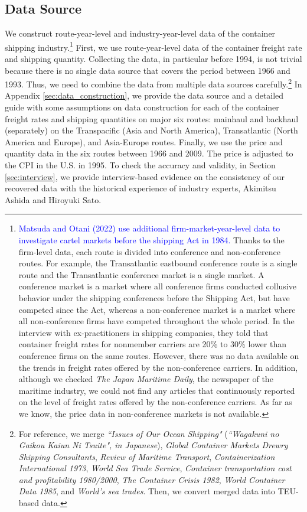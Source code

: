 \documentclass[11pt]{article}
\begin{document}
\subsection{Data Source}\label{subsec:data}
We construct route-year-level and industry-year-level data of the container shipping industry.\footnote{\textcolor{blue}{Matsuda and Otani (2022) use additional firm-market-year-level data to investigate cartel markets before the shipping Act in 1984.} Thanks to the firm-level data, each route is divided into conference and non-conference routes. For example, the Transatlantic eastbound conference route is a single route and the Transatlantic conference market is a single market. A conference market is a market where all conference firms conducted collusive behavior under the shipping conferences before the Shipping Act, but have competed since the Act, whereas a non-conference market is a market where all non-conference firms have competed throughout the whole period. In the interview with ex-practitioners in shipping companies, they told that container freight rates for nonmember carriers are 20\% to 30\% lower than conference firms on the same routes. However, there was no data available on the trends in freight rates offered by the non-conference carriers. In addition, although we checked \textit{The Japan Maritime Daily}, the newspaper of the maritime industry, we could not find any articles that continuously reported on the level of freight rates offered by the non-conference carriers. As far as we know, the price data in non-conference markets is not available.} First, we use route-year-level data of the container freight rate and shipping quantity. Collecting the data, in particular before 1994, is not trivial because there is no single data source that covers the period between 1966 and 1993. Thus, we need to combine the data from multiple data sources carefully.\footnote{For reference, we merge \textit{``Issues of Our Ocean Shipping"} (\textit{``Wagakuni no Gaikou Kaiun Ni Tsuite", in Japanese}), \textit{Global Container Markets Drewry Shipping Consultants}, \textit{Review of Maritime Transport}, \textit{Containerization International 1973}, \textit{World Sea Trade Service}, \textit{Container transportation cost and profitability 1980/2000}, \textit{The Container Crisis 1982}, \textit{World Container Data 1985}, and \textit{World's sea trades}. Then, we convert merged data into TEU-based data.} In Appendix \ref{sec:data_construction}, we provide the data source and a detailed guide with some assumptions on data construction for each of the container freight rates and shipping quantities on major six routes: mainhaul and backhaul (separately) on the Transpacific (Asia and North America), Transatlantic (North America and Europe), and Asia-Europe routes. Finally, we use the price and quantity data in the six routes between 1966 and 2009. The price is adjusted to the CPI in the U.S. in 1995. To check the accuracy and validity, in Section \ref{sec:interview}, we provide interview-based evidence on the consistency of our recovered data with the historical experience of industry experts, Akimitsu Ashida and Hiroyuki Sato.
\end{document}
